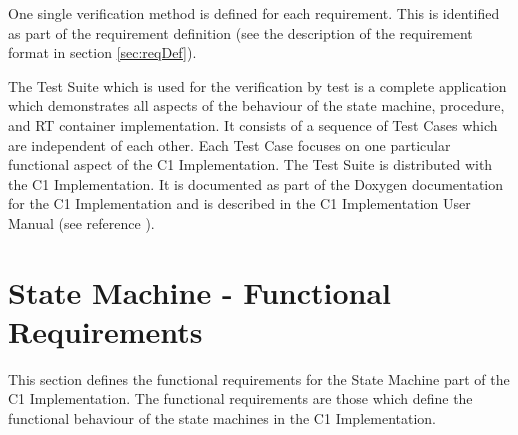 \documentclass[requirements]{../fwprofile}
\begin{document}
One single verification method is defined for each requirement. 
This is identified as part of the requirement definition (see the description of the requirement format in section \ref{sec:reqDef}).

The Test Suite which is used for the verification by test is a complete application which demonstrates all aspects 
of the behaviour of the state machine, procedure, and RT container implementation. 
It consists of a sequence of Test Cases which are independent of each other. 
Each Test Case focuses on one particular functional aspect of the C1 Implementation. 
The Test Suite is distributed with the C1 Implementation.
It is documented as part of the Doxygen documentation for the C1 Implementation and is described in the C1 Implementation User Manual (see reference \cite{ref:um}).


\fwbreakbeforesubsections


\section{State Machine - Functional Requirements}\label{sec:smFncReqs}
This section defines the functional requirements for the State Machine part of the C1 Implementation. 
The functional requirements are those which define the functional behaviour of the state machines in the C1 Implementation.

\end{document}
